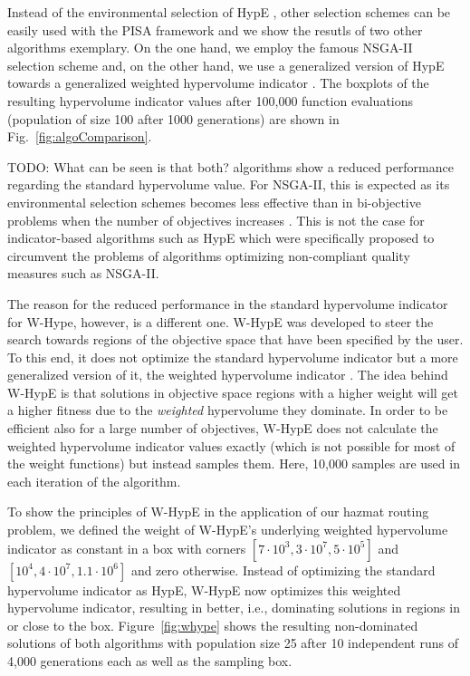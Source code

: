 \documentclass[preprint,12pt]{elsarticle}
\newcommand{\TODO}[1]{{\color{red}TODO: #1}}
\begin{document}
Instead of the environmental selection of HypE \citep{bz2011a}, other selection schemes can be easily used with the PISA framework and we show the resutls of two other algorithms exemplary. On the one hand, we employ the famous NSGA-II selection scheme \citep{dapm2002a} and, on the other hand, we use a generalized version of HypE towards a generalized weighted hypervolume indicator \citep{abbz2009b,bbtz2011a}. The boxplots of the resulting hypervolume indicator values after 100,000 function evaluations (population of size 100 after 1000 generations) are shown in Fig.~\ref{fig:algoComparison}. \TODO{What can be seen is that both? algorithms show a reduced performance regarding the standard hypervolume value. For NSGA-II, this is expected as its environmental selection schemes becomes less effective than in bi-objective problems when the number of objectives increases \citep{wbn2007a,bz2011a}. This is not the case for indicator-based algorithms such as HypE which were specifically proposed to circumvent the problems of algorithms optimizing non-compliant quality measures such as NSGA-II.

The reason for the reduced performance in the standard hypervolume indicator for W-Hype, however, is a different one. W-HypE was developed to steer the search towards regions of the objective space that have been specified by the user. To this end, it does not optimize the standard hypervolume indicator but a more generalized version of it, the weighted hypervolume indicator \citep{zbt2007a}. The idea behind W-HypE is that solutions in objective space regions with a higher weight will get a higher fitness due to the \emph{weighted} hypervolume they dominate. In order to be efficient also for a large number of objectives, W-HypE does not calculate the weighted hypervolume indicator values exactly (which is not possible for most of the weight functions) but instead samples them. Here, 10,000 samples are used in each iteration of the algorithm.

To show the principles of W-HypE in the application of our hazmat routing problem, we defined the weight of W-HypE's underlying weighted hypervolume indicator as constant in a box with corners $[7\cdot 10^3, 3\cdot 10^7, 5\cdot 10^5]$ and $[10^4, 4\cdot 10^7, 1.1\cdot 10^6]$ and zero otherwise. Instead of optimizing the standard hypervolume indicator as HypE, W-HypE now optimizes this weighted hypervolume indicator, resulting in better, i.e., dominating solutions in regions in or close to the box. Figure~\ref{fig:whype} shows the resulting non-dominated solutions of both algorithms with population size 25 after 10 independent runs of 4,000 generations each as well as the sampling box.}
\end{document}
